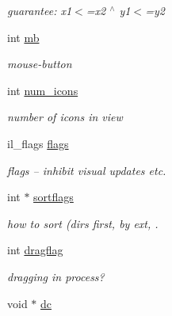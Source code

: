 \begin{CompactItemize}
\begin{CompactList}\small\item\em guarantee: x1$<$=x2 $^\wedge$ y1$<$=y2 \item\end{CompactList}\item 
\hypertarget{struct__icon__list_o30}{
int \hyperlink{struct__icon__list_o30}{mb}}
\label{struct__icon__list_o30}

\begin{CompactList}\small\item\em mouse-button \item\end{CompactList}\item 
\hypertarget{struct__icon__list_o31}{
int \hyperlink{struct__icon__list_o31}{num\_\-icons}}
\label{struct__icon__list_o31}

\begin{CompactList}\small\item\em number of icons in view \item\end{CompactList}\item 
\hypertarget{struct__icon__list_o32}{
il\_\-flags \hyperlink{struct__icon__list_o32}{flags}}
\label{struct__icon__list_o32}

\begin{CompactList}\small\item\em flags -- inhibit visual updates etc. \item\end{CompactList}\item 
int $\ast$ \hyperlink{struct__icon__list_o33}{sortflags}
\begin{CompactList}\small\item\em how to sort (dirs first, by ext, . \item\end{CompactList}\item 
\hypertarget{struct__icon__list_o34}{
int \hyperlink{struct__icon__list_o34}{dragflag}}
\label{struct__icon__list_o34}

\begin{CompactList}\small\item\em dragging in process? \item\end{CompactList}\item 
\hypertarget{struct__icon__list_o35}{
void $\ast$ \hyperlink{struct__icon__list_o35}{dc}}
\label{struct__icon__list_o35}


\end{CompactItemize}
